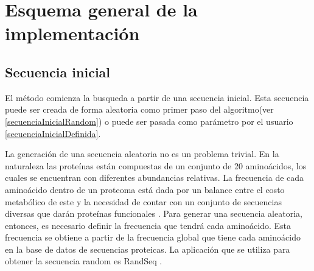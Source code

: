 % 
% 
% 
%  
% 



\section{Esquema general de la implementación}




\subsection{Secuencia inicial}

El método comienza la busqueda a partir de una secuencia inicial. 
Esta secuencia puede ser creada de forma aleatoria como primer paso del algoritmo(ver \ref{secuenciaInicialRandom}) o puede ser pasada como parámetro por el usuario \ref{secuenciaInicialDefinida}. 

La generación de una secuencia aleatoria no es un problema trivial. 
En la naturaleza las proteínas están compuestas de un conjunto de 20 aminoácidos, los cuales se encuentran con diferentes abundancias relativas. 
La frecuencia de cada aminoácido dentro de un proteoma está dada por un balance entre el costo metabólico de este y la necesidad de contar con un conjunto de secuencias diversas que darán proteínas funcionales \cite{krick2014amino}. 
Para generar una secuencia aleatoria, entonces, es necesario definir la frecuencia que tendrá cada aminoácido. 
Esta frecuencia se obtiene a partir de la frecuencia global que tiene cada aminoácido en la base de datos de secuencias proteicas.
La aplicación que se utiliza para obtener la secuencia random es RandSeq \cite{randseq}.

